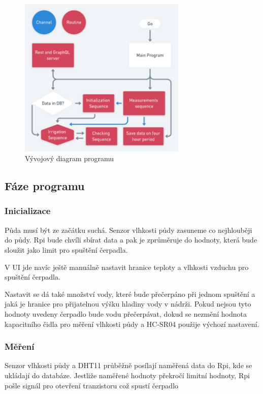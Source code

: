 \documentclass[11pt,a4paper]{article}
\begin{document}
\begin{figure}[h]
	\centering
	\includegraphics[width=8cm]{go.png}
	\caption*{Vývojový diagram programu}
\end{figure}

\subsection*{Fáze programu}

\subsubsection*{Inicializace}

Půda musí být ze začátku suchá. Senzor vlhkosti půdy zasuneme co nejhlouběji do půdy. Rpi bude chvíli sbírat data a pak je zprůměruje do hodnoty, která bude sloužit jako limit pro spuštění čerpadla.

V UI jde navíc ještě manuálně nastavit hranice teploty a vlhkosti vzduchu pro spuštění čerpadla.

Nastavit se dá také množství vody, které bude přečerpáno při jednom spuštění a jaká je hranice pro přijatelnou výšku hladiny vody v nádrži. Pokud nejsou tyto hodnoty uvedeny čerpadlo bude vodu přečerpávat, dokud se nezmění hodnota kapacitního čidla pro měření vlhkosti půdy a HC-SR04 použije výchozí nastavení.

\subsubsection*{Měření}

Senzor vlhkosti půdy a DHT11 průběžně posílají naměřená data do Rpi, kde se ukládají do databáze. Jestliže naměřené hodnoty překročí limitní hodnoty, Rpi pošle signál pro otevření tranzistoru což spustí čerpadlo
\end{document}
